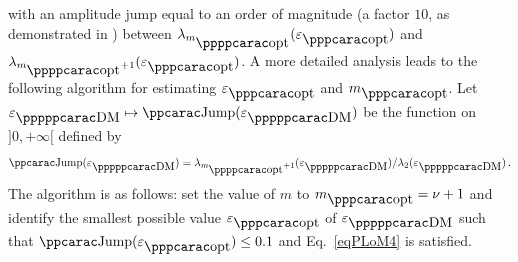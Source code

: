 %
with an amplitude jump equal to an order of magnitude (a factor $10$, as demonstrated in \cite{Soize2020c}) between
$\lambda_{m_\popt}(\varepsilon_\opt)$ and $\lambda_{m_\popt +1}(\varepsilon_\opt)$.
A more detailed analysis leads to the following algorithm for estimating $\varepsilon_\opt$ and $m_\opt$. Let $\varepsilon_\DM\mapsto \Jump(\varepsilon_\DM)$ be the function on $ ] 0 , + \infty [ $ defined by
%
\begin{equation} \label{eqPLoM5}
\Jump(\varepsilon_\DM) = \lambda_{m_\popt+1}(\varepsilon_\DM) / \lambda_2(\varepsilon_\DM) \, .
\end{equation}
%
The algorithm is as follows: set the value of $m$ to $m_\opt = \nu+1$ and identify the smallest possible value $\varepsilon_\opt$ of $\varepsilon_\DM$ such that $\Jump(\varepsilon_\opt) \leq 0.1$ and Eq.~\eqref{eqPLoM4} is satisfied.


